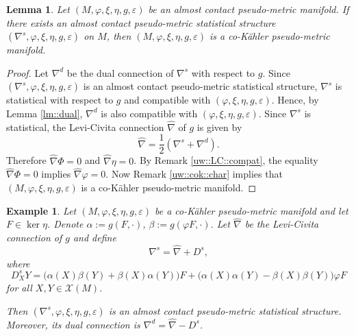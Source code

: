 \documentclass[12pt,a4paper,final]{amsart}
\numberwithin{equation}{section}
\newtheorem{lm}[tw]{Lemma}
\theoremstyle{df}
\newtheorem{ex}[tw]{Example}
\newcommand{\X}{\mathcal{X}}
\newcommand{\XM}{\X(M)}
\newcommand{\eps}{\varepsilon}
\begin{document}
\begin{lm}\label{lm::acstat}
Let $(M,\varphi,\xi,\eta,g,\eps)$ be an almost contact pseudo-metric manifold.
If there exists an almost contact pseudo-metric statistical structure
$(\nabla^s,\varphi,\xi,\eta,g,\eps)$ on $M$, then
$(M,\varphi,\xi,\eta,g,\eps)$ is a co-K\"ahler pseudo-metric manifold.
\end{lm}
\begin{proof}
Let $\nabla^d$ be the dual connection of $\nabla^s$ with respect to $g$.
Since $(\nabla^s,\varphi,\xi,\eta,g,\eps)$ is an almost contact pseudo-metric
statistical structure, $\nabla^s$ is statistical with respect to $g$ and
compatible with $(\varphi,\xi,\eta,g,\eps)$. Hence, by
Lemma \ref{lm::dual}, $\nabla^d$ is also compatible with
$(\varphi,\xi,\eta,g,\eps)$.
Since $\nabla^s$ is statistical, the Levi-Civita connection $\widehat{\nabla}$
of $g$ is given by
$$
\widehat{\nabla}=\frac12(\nabla^s+\nabla^d).
$$
Therefore $\widehat{\nabla}\Phi=0$ and $\widehat{\nabla}\eta=0$.
By Remark \ref{uw::LC::compat}, the equality $\widehat{\nabla}\Phi=0$ implies $\widehat{\nabla}\varphi=0$.
Now Remark \ref{uw::cok::char} implies that  $(M,\varphi,\xi,\eta,g,\eps)$ is a co-K\"ahler pseudo-metric manifold.
\end{proof}

\begin{ex}\label{ex::acstat}
Let $(M,\varphi,\xi,\eta,g,\eps)$ be a co-K\"ahler pseudo-metric manifold and
let $F\in\ker\eta$. Denote $\alpha:=g(F,\cdot)$, $\beta:=g(\varphi F,\cdot)$.
Let $\widehat{\nabla}$ be the Levi-Civita connection of $g$ and define
$$
\nabla^s=\widehat{\nabla}+D^s,
$$
where
\begin{equation}\label{eq::Ds::ac}
D^s_XY=
\bigl(\alpha(X)\beta(Y)+\beta(X)\alpha(Y)\bigr)F
+\bigl(\alpha(X)\alpha(Y)-\beta(X)\beta(Y)\bigr)\varphi F
\end{equation}
for all $X,Y\in\XM$.
\par Then $(\nabla^s,\varphi,\xi,\eta,g,\eps)$ is an almost contact pseudo-metric
statistical structure. Moreover, its dual connection is $\nabla^d=\widehat{\nabla}-D^s$.
\end{ex}
\end{document}

